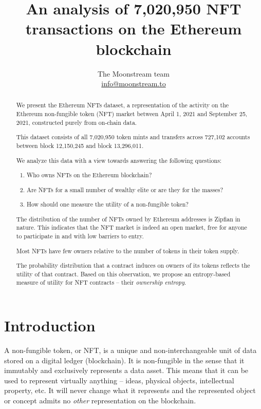 \documentclass{article}
\title{An analysis of 7,020,950 NFT transactions on the Ethereum blockchain}
\author{
    The Moonstream team\\
    \href{mailto:info@moonstream.to}{info@moonstream.to}
}
\begin{document}
\maketitle

\begin{abstract}
We present the Ethereum NFTs dataset, a representation of the activity on the Ethereum non-fungible
token (NFT) market between April 1, 2021 and September 25, 2021, constructed purely from on-chain data.

This dataset consists of all 7,020,950 token mints and transfers across 727,102 accounts between block 12,150,245 and block 13,296,011.

We analyze this data with a view towards answering the following questions:
\begin{enumerate}
\item Who owns NFTs on the Ethereum blockchain?
\item Are NFTs for a small number of wealthy elite or are they for the masses?
\item How should one measure the utility of a non-fungible token?
\end{enumerate}

The distribution of the number of NFTs owned by Ethereum addresses is
Zipfian in nature. This indicates that the NFT market is indeed an open market, free for anyone to
participate in and with low barriers to entry.

Most NFTs have few owners relative to the number of tokens in their token supply.

The probability distribution that a contract induces on owners of its tokens reflects the utility of that contract. Based on this observation, we propose an entropy-based measure of utility for NFT contracts -- their \emph{ownership entropy}.

\end{abstract}

\section{Introduction}

A non-fungible token, or NFT, is a unique and non-interchangeable unit of data
stored on a digital ledger (blockchain)\cite{nft-definition}. It is non-fungible in the sense that it immutably and exclusively represents a data asset. This means that it can be used to represent virtually anything -- ideas, physical objects, intellectual property, etc. It will never change what it represents and the represented object or concept admits no \emph{other} representation on the blockchain.
\end{document}
